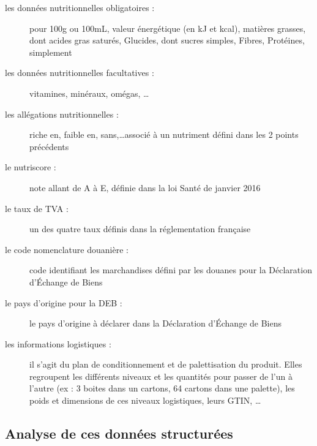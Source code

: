 \begin{description}
            \item[les données nutritionnelles obligatoires :] pour 100g ou 100mL, valeur énergétique (en kJ et kcal), matières grasses, dont acides gras saturés, Glucides, dont sucres simples, Fibres, Protéines, simplement
            \item[les données nutritionnelles facultatives :] vitamines, minéraux, omégas, \dots
            \item[les allégations nutritionnelles :] riche en, faible en, sans,\dots associé à un nutriment défini dans les 2 points précédents
            \item[le nutriscore :] note allant de A à E, définie dans la loi Santé de janvier 2016
            \item[le taux de TVA :] un des quatre taux définis dans la réglementation française
            \item[le code nomenclature douanière :] code identifiant les marchandises défini par les douanes pour la Déclaration d'\'{E}change de Biens~\cite{notions_DEB}
            \item[le pays d'origine pour la DEB :] le pays d'origine à déclarer dans la Déclaration d'\'{E}change de Biens~\cite{notions_DEB}
            \item[les informations logistiques :] il s'agit du plan de conditionnement et de palettisation du produit. Elles regroupent les différents niveaux et les quantités pour passer de l'un à l'autre (ex : 3 boites dans un cartons, 64 cartons dans une palette), les poids et dimensions de ces niveaux logistiques, leurs GTIN, \dots
        \end{description}
        
            \subsection{Analyse de ces données structurées}

